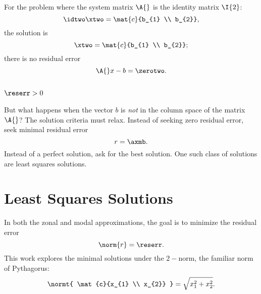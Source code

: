 For the problem where the system matrix $\A{}$ is the identity matrix $\I{2}$:
  \begin{equation*}   %
      \idtwo \xtwo = \mat{c}{b_{1} \\ b_{2}},
  \end{equation*}
the solution is
  \begin{equation*}   %
      \xtwo = \mat{c}{b_{1} \\ b_{2}} ;
  \end{equation*}
there is no residual error 
  \begin{equation*}   %
      \A{} x - b = \zerotwo .
  \end{equation*}

\subsection{\label{ssec:no exact soln}$\reserr > 0$}  %
But what happens when the vector $b$ is \emph{not} in the column space of the matrix $\A{}$? The solution criteria must relax. Instead of seeking zero residual error, seek minimal residual error
  \begin{equation*}   %
    r = \axmb .
  \end{equation*}
Instead of a perfect solution, ask for the best solution. One such class of solutions are least squares solutions.

\section{\label{sec:lss}Least Squares Solutions}  %
In both the zonal and modal approximations, the goal is to minimize the residual error
  \begin{equation*}   %
      \norm{r} = \reserr.
  \end{equation*}
This work explores the minimal solutions under the $2-$norm, the familiar norm of Pythagorus:
  \begin{equation*}   %
      \normt{ \mat{c}{x_{1} \\ x_{2}} } = \sqrt{x_{1}^{2} + x_{2}^{2}}.
  \end{equation*}

